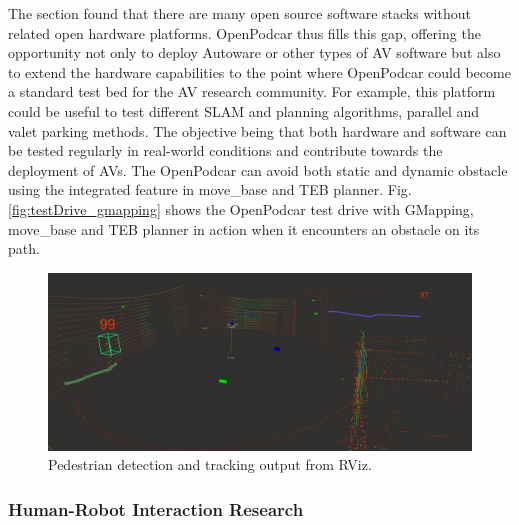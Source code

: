 \documentclass[a4paper]{article}
\begin{document}
	The  section found that there are many open source software stacks without related open hardware platforms.  OpenPodcar thus fills this gap, offering the opportunity not only to deploy Autoware or other types of AV software but also to extend the hardware capabilities to the point where OpenPodcar could become a standard test bed for the AV research community. For example, this platform could be useful to test different SLAM and planning algorithms, parallel and valet parking methods. The objective being that both hardware and software can be tested regularly in real-world conditions and contribute towards the deployment of AVs. The OpenPodcar can avoid both static and dynamic obstacle using the integrated feature in move\_base and TEB planner. Fig. \ref{fig:testDrive_gmapping} shows the OpenPodcar test drive with GMapping, move\_base and TEB planner in action when it encounters an obstacle on its path.     
	
	\begin{figure}
		\centering
		\includegraphics[width=0.7\columnwidth]{software/tracker.png}
		\caption{Pedestrian detection and tracking output from RViz.}
		\label{fig:detection_tracking}
	\end{figure}
	
	\subsubsection{Human-Robot Interaction Research}
	
\end{document}
